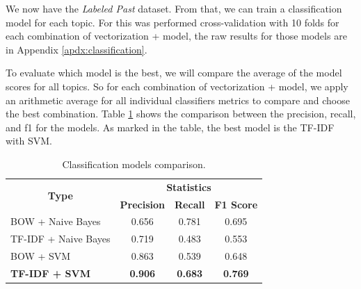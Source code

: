 
We now have the \textit{Labeled Past} dataset. From that, we can train a classification model for each topic. For this was performed cross-validation with 10 folds for each combination of vectorization + model, the raw results for those models are in Appendix \ref{apdx:classification}.


To evaluate which model is the best, we will compare the average of the model scores for all topics. 
So for each combination of vectorization + model, we apply an arithmetic average for all individual classifiers metrics to compare and choose the best combination.
Table \ref{tab:classification-report} shows the comparison between the precision, recall, and f1 for the models.
As marked in the table, the best model is the TF-IDF with SVM.

\begin{table}[h!]
	\centering
	\caption{Classification models comparison.}
	\label{tab:classification-report}
	\begin{tabular}{c|ccc}
		\toprule
		\multirow{2}{*}{\textbf{Type}} & \multicolumn{3}{c}{\textbf{Statistics}} \\\cmidrule{2-4}
		 & \textbf{Precision} & \textbf{Recall} & \textbf{F1 Score} \\ \midrule
		\multicolumn{1}{l|}{BOW + Naive Bayes}     & 0.656 & 0.781 & 0.695 \\
		\multicolumn{1}{l|}{TF-IDF + Naive Bayes}  & 0.719 & 0.483 & 0.553 \\
		\multicolumn{1}{l|}{BOW + SVM}             & 0.863 & 0.539 & 0.648 \\
		\multicolumn{1}{l|}{\textbf{TF-IDF + SVM}} & \textbf{0.906} & \textbf{0.683} & \textbf{0.769} \\
		\bottomrule
	\end{tabular}
\end{table}

